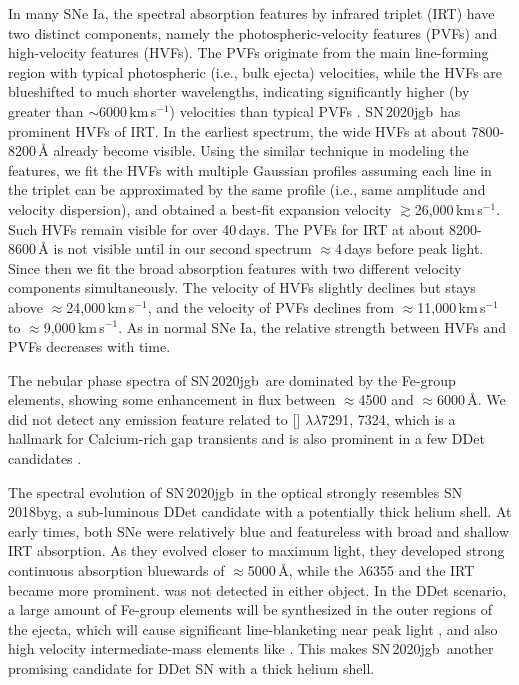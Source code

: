 \documentclass[twocolumn]{aastex631}
\newcommand{\sn}{SN\,2020jgb}
\begin{document}
In many SNe Ia, the spectral absorption features by  infrared triplet (IRT) have two distinct components, namely the photospheric-velocity features (PVFs) and high-velocity features (HVFs). The PVFs originate from the main line-forming region with typical photospheric (i.e., bulk ejecta) velocities, while the HVFs are blueshifted to much shorter wavelengths, indicating significantly higher (by greater than $\sim$6000\,km\,s$^{-1}$) velocities than typical PVFs \citep{Silverman_HVF_2015}. \sn\ has prominent HVFs of  IRT. In the earliest spectrum, the wide HVFs at about 7800-8200\,\r{A} already become visible. Using the similar technique in modeling the  features, we fit the HVFs with multiple Gaussian profiles assuming each line in the triplet can be approximated by the same profile (i.e., same amplitude and velocity dispersion), and obtained a best-fit expansion velocity $\gtrsim$26,000\,km\,s$^{-1}$. Such HVFs remain visible for over 40\,days. The PVFs for  IRT at about 8200-8600\,\r{A} is not visible until in our second spectrum $\approx$4\,days before peak light. Since then we fit the broad absorption features with two different velocity components simultaneously. The velocity of HVFs slightly declines but stays above $\approx$24,000\,km\,s$^{-1}$, and the velocity of PVFs declines from $\approx$11,000\,km\,s$^{-1}$ to $\approx$9,000\,km\,s$^{-1}$. As in normal SNe Ia, the relative strength between HVFs and PVFs decreases with time.

The nebular phase spectra of \sn\ are dominated by the Fe-group elements, showing some enhancement in flux between $\approx$4500 and $\approx$6000\,\r{A}. We did not detect any emission feature related to [] $\lambda\lambda$7291, 7324, which is a hallmark for Calcium-rich gap transients and is also prominent in a few DDet candidates \citep[e.g., SN\,2016hnk and SN\,2019ofm;][]{De_Ca-rich_2020}. 

The spectral evolution of \sn\ in the optical strongly resembles SN\,2018byg, a sub-luminous DDet candidate with a potentially thick helium shell. At early times, both SNe were relatively blue and featureless with broad and shallow  IRT absorption. As they evolved closer to maximum light, they developed strong continuous absorption bluewards of $\approx$5000\,\r{A}, while the  $\lambda$6355 and the  IRT became more prominent.  was not detected in either object. In the DDet scenario, a large amount of Fe-group elements will be synthesized in the outer regions of the ejecta, which will cause significant line-blanketing near peak light \citep{Kromer_DD_2010, polin_observational_2019}, and also high velocity intermediate-mass elements like  \citep{Fink_DD_2010, Kromer_DD_2010}. This makes \sn\ another promising candidate for DDet SN with a thick helium shell. 
\end{document}
